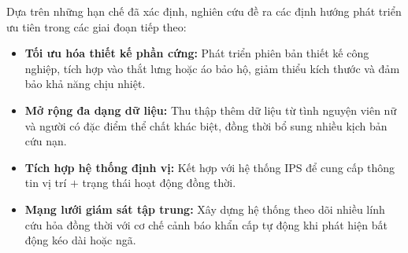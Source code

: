 Dựa trên những hạn chế đã xác định, nghiên cứu đề ra các định hướng phát triển ưu tiên trong các giai đoạn tiếp theo:

\begin{itemize}
    \item \textbf{Tối ưu hóa thiết kế phần cứng:} Phát triển phiên bản thiết kế công nghiệp, tích hợp vào thắt lưng hoặc áo bảo hộ, giảm thiểu kích thước và đảm bảo khả năng chịu nhiệt.
    \item \textbf{Mở rộng đa dạng dữ liệu:} Thu thập thêm dữ liệu từ tình nguyện viên nữ và người có đặc điểm thể chất khác biệt, đồng thời bổ sung nhiều kịch bản cứu nạn.
    \item \textbf{Tích hợp hệ thống định vị:} Kết hợp với hệ thống IPS để cung cấp thông tin vị trí $+$ trạng thái hoạt động đồng thời.
    \item \textbf{Mạng lưới giám sát tập trung:} Xây dựng hệ thống theo dõi nhiều lính cứu hỏa đồng thời với cơ chế cảnh báo khẩn cấp tự động khi phát hiện bất động kéo dài hoặc ngã.
\end{itemize}